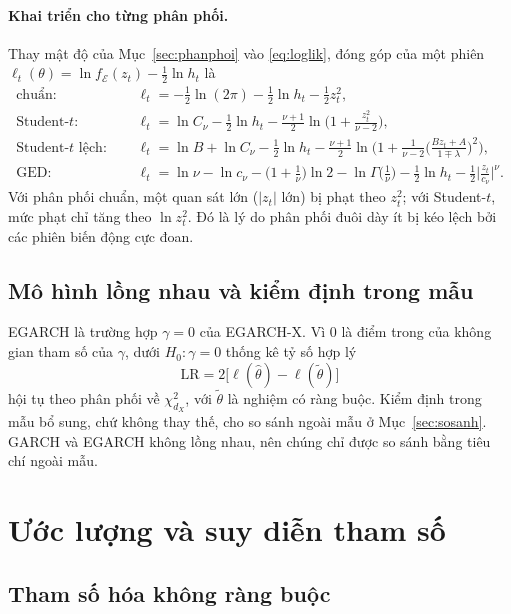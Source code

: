 \documentclass[12pt,a4paper]{article}
\theoremstyle{definition}
\theoremstyle{remark}
\newcommand{\Ecal}{\mathcal{E}}
\begin{document}
\paragraph{Khai triển cho từng phân phối.} Thay mật độ của Mục~\ref{sec:phanphoi} vào \eqref{eq:loglik}, đóng góp của một phiên $\ell_t(\theta)=\ln f_\Ecal(z_t)-\tfrac12\ln h_t$ là
\begin{align*}
\text{chuẩn: }\quad&\ell_t=-\tfrac12\ln(2\pi)-\tfrac12\ln h_t-\tfrac12 z_t^2,\\
\text{Student-}t\text{: }\quad&\ell_t=\ln C_\nu-\tfrac12\ln h_t-\tfrac{\nu+1}{2}\ln\Big(1+\frac{z_t^2}{\nu-2}\Big),\\
\text{Student-}t\text{ lệch: }\quad&\ell_t=\ln B+\ln C_\nu-\tfrac12\ln h_t-\tfrac{\nu+1}{2}\ln\Big(1+\frac{1}{\nu-2}\Big(\frac{Bz_t+A}{1\mp\lambda}\Big)^2\Big),\\
\text{GED: }\quad&\ell_t=\ln\nu-\ln c_\nu-\big(1+\tfrac1\nu\big)\ln2-\ln\Gamma\big(\tfrac1\nu\big)-\tfrac12\ln h_t-\tfrac12\Big|\frac{z_t}{c_\nu}\Big|^{\nu}.
\end{align*}
Với phân phối chuẩn, một quan sát lớn ($|z_t|$ lớn) bị phạt theo $z_t^2$; với Student-$t$, mức phạt chỉ tăng theo $\ln z_t^2$. Đó là lý do phân phối đuôi dày ít bị kéo lệch bởi các phiên biến động cực đoan.

\subsection{Mô hình lồng nhau và kiểm định trong mẫu}

EGARCH là trường hợp $\gamma=0$ của EGARCH-X. Vì $0$ là điểm trong của không gian tham số của $\gamma$, dưới $H_0:\gamma=0$ thống kê tỷ số hợp lý
\begin{equation}
\mathrm{LR}=2\big[\ell(\hat\theta)-\ell(\tilde\theta)\big]
\end{equation}
hội tụ theo phân phối về $\chi^2_{d_X}$, với $\tilde\theta$ là nghiệm có ràng buộc. Kiểm định trong mẫu bổ sung, chứ không thay thế, cho so sánh ngoài mẫu ở Mục~\ref{sec:sosanh}. GARCH và EGARCH không lồng nhau, nên chúng chỉ được so sánh bằng tiêu chí ngoài mẫu.

\section{Ước lượng và suy diễn tham số}\label{sec:uocluong}

\subsection{Tham số hóa không ràng buộc}
\end{document}
